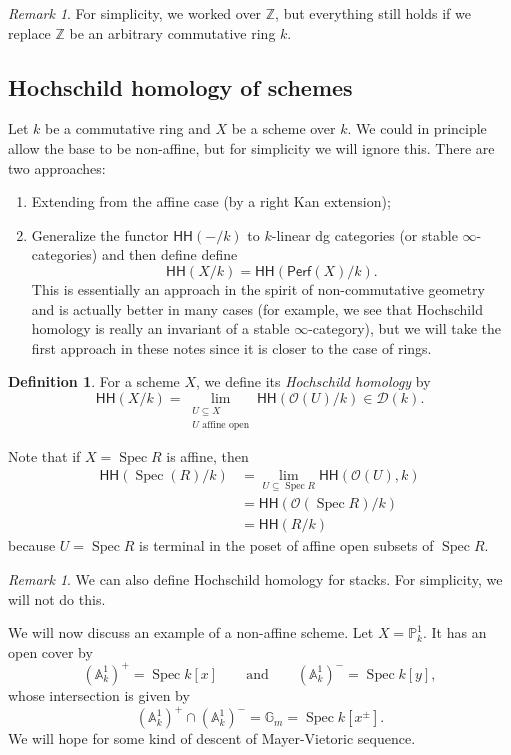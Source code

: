 \documentclass[10pt]{amsart}
\theoremstyle{definition}
\newtheorem{defn}[thm]{Definition}
\theoremstyle{remark}
\newtheorem{rmk}[thm]{Remark}
\theoremstyle{plain}
\theoremstyle{definition}
\theoremstyle{remark}
\newcommand{\A}{\mathbb{A}}
\newcommand{\G}{\mathbb{G}}
\newcommand{\Z}{\mathbb{Z}}
\renewcommand{\P}{\mathbb{P}}
\newcommand{\mc}[1]{\mathcal{#1}}
\newcommand{\ms}[1]{\mathsf{#1}}
\newcommand{\1}{\mathbf{1}}
\newcommand{\2}{\mathbf{2}}
\newcommand{\3}{\mathbf{3}}
\newcommand{\HH}{\ms{HH}}
\DeclareMathOperator{\Spec}{Spec}
\begin{document}
\begin{rmk}
    For simplicity, we worked over $\Z$, but everything still holds if we replace $\Z$ be an arbitrary commutative ring $k$.
\end{rmk}

\subsection{Hochschild homology of schemes}%
\label{sub:Hochschild homology of schemes}

Let $k$ be a commutative ring and $X$ be a scheme over $k$. We could in principle allow the base to be non-affine, but for simplicity we will ignore this. There are two approaches:
\begin{enumerate}
    \item Extending from the affine case (by a right Kan extension);
    \item Generalize the functor $\HH(-/k)$ to $k$-linear dg categories (or stable $\infty$-categories) and then define define
    \[ \HH(X/k) = \HH(\ms{Perf}(X)/k). \]
    This is essentially an approach in the spirit of non-commutative geometry and is actually better in many cases (for example, we see that Hochschild homology is really an invariant of a stable $\infty$-category), but we will take the first approach in these notes since it is closer to the case of rings.
\end{enumerate}

\begin{defn}
    For a scheme $X$, we define its \textit{Hochschild homology} by
    \[ \HH(X/k) = \lim_{\substack{U \subseteq X \\ U \text{ affine open}}} \HH(\mc{O}(U)/k) \in \mc{D}(k). \]
\end{defn}

Note that if $X = \Spec R$ is affine, then
\begin{align*}
    \HH(\Spec(R)/k) &= \lim_{U \subseteq \Spec R} \HH(\mc{O}(U), k) \\
    &= \HH(\mc{O}(\Spec R)/k) \\
    &= \HH(R/k)
\end{align*}
because $U = \Spec R$ is terminal in the poset of affine open subsets of $\Spec R$.

\begin{rmk}
    We can also define Hochschild homology for stacks. For simplicity, we will not do this.
\end{rmk}


We will now discuss an example of a non-affine scheme. Let $X = \P^1_k$. It has an open cover by
\[ (\A^1_k)^+ = \Spec k[x] \qquad \text{and} \qquad (\A_k^1)^- = \Spec k[y], \]
whose intersection is given by
\[ (\A_k^1)^+ \cap (\A_k^1)^- = \G_m = \Spec k[x^{\pm}]. \]
We will hope for some kind of descent of Mayer-Vietoric sequence.
\end{document}
